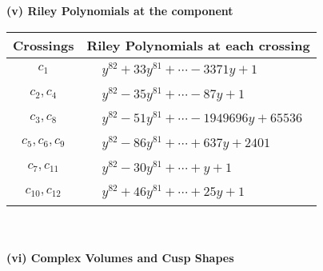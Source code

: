 \documentclass[1p]{elsarticle_modified}
\theoremstyle{definition}
\begin{document}
\newpage\renewcommand{\arraystretch}{1}
\flushleft \textbf{(v) Riley Polynomials at the component}\newline \\
\begin{tabular}{m{50pt}|m{274pt}}
Crossings & \hspace{64pt}Riley Polynomials at each crossing \\
\hline $$\begin{aligned}c_{1}\end{aligned}$$&$\begin{aligned}
&y^{82}+33 y^{81}+\cdots-3371 y+1
\end{aligned}$\\
\hline $$\begin{aligned}c_{2},c_{4}\end{aligned}$$&$\begin{aligned}
&y^{82}-35 y^{81}+\cdots-87 y+1
\end{aligned}$\\
\hline $$\begin{aligned}c_{3},c_{8}\end{aligned}$$&$\begin{aligned}
&y^{82}-51 y^{81}+\cdots-1949696 y+65536
\end{aligned}$\\
\hline $$\begin{aligned}c_{5},c_{6},c_{9}\end{aligned}$$&$\begin{aligned}
&y^{82}-86 y^{81}+\cdots+637 y+2401
\end{aligned}$\\
\hline $$\begin{aligned}c_{7},c_{11}\end{aligned}$$&$\begin{aligned}
&y^{82}-30 y^{81}+\cdots+y+1
\end{aligned}$\\
\hline $$\begin{aligned}c_{10},c_{12}\end{aligned}$$&$\begin{aligned}
&y^{82}+46 y^{81}+\cdots+25 y+1
\end{aligned}$\\
\hline
\end{tabular}\\~\\
\newpage\flushleft \textbf{(vi) Complex Volumes and Cusp Shapes}
\end{document}
